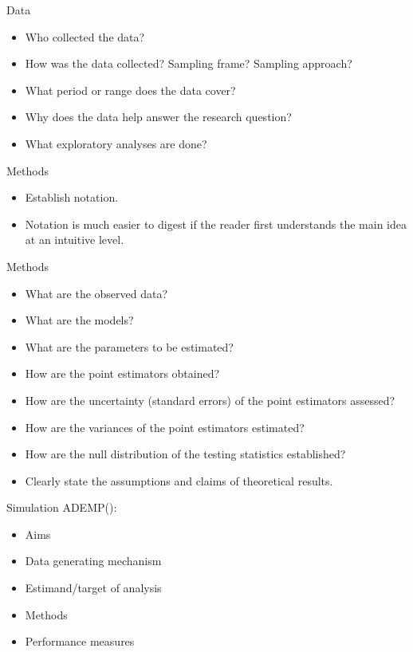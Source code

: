 \documentclass{beamer}
\begin{document}
    
    \begin{frame}{Data}
    \begin{itemize}
        \item Who collected the data?
        \item How was the data collected? Sampling frame? Sampling approach?
        \item What period or range does the data cover?
        \item Why does the data help answer the research question?
        \item What exploratory analyses are done?
    \end{itemize}
    \end{frame}
    
    
    \begin{frame}{Methods}
    \begin{itemize}
        \item Establish notation.
        \item Notation is much easier to digest if the reader first understands the main idea at an intuitive level.
    \end{itemize}
    \end{frame}
    
    
    \begin{frame}{Methods}
    \begin{itemize}
        \item What are the observed data?
        \item What are the models?
        \item What are the parameters to be estimated?
        \item How are the point estimators obtained?
        \item How are the uncertainty (standard errors) of the point estimators assessed?
        \item How are the variances of the point estimators estimated?
        \item How are the null distribution of the testing statistics established?
        \item Clearly state the assumptions and claims of theoretical results.
    \end{itemize}
    \end{frame}
    
    
    \begin{frame}{Simulation}
    ADEMP(\citet{Morris}):
    \begin{itemize}
        \item Aims
        \item Data generating mechanism
        \item Estimand/target of analysis
        \item Methods
        \item Performance measures
    \end{itemize}
    \end{frame}
    
\end{document}
